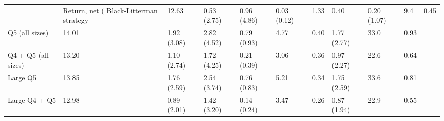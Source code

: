 \begin{tabular}{llllllllll}
\toprule
 & Return, net (%
\midrule
Black-Litterman strategy & 12.63 & 0.53 (2.75) & 0.96 (4.86) & 0.03 (0.12) & 1.33 & 0.40 & 0.20 (1.07) & 9.4 & 0.45 \\
Q5 (all sizes) & 14.01 & 1.92 (3.08) & 2.82 (4.52) & 0.79 (0.93) & 4.77 & 0.40 & 1.77 (2.77) & 33.0 & 0.93 \\
Q4 + Q5 (all sizes) & 13.20 & 1.10 (2.74) & 1.72 (4.25) & 0.21 (0.39) & 3.06 & 0.36 & 0.97 (2.27) & 22.6 & 0.64 \\
Large Q5 & 13.85 & 1.76 (2.59) & 2.54 (3.74) & 0.76 (0.83) & 5.21 & 0.34 & 1.75 (2.59) & 33.6 & 0.81 \\
Large Q4 + Q5 & 12.98 & 0.89 (2.01) & 1.42 (3.20) & 0.14 (0.24) & 3.47 & 0.26 & 0.87 (1.94) & 22.9 & 0.55 \\
\bottomrule
\end{tabular}
